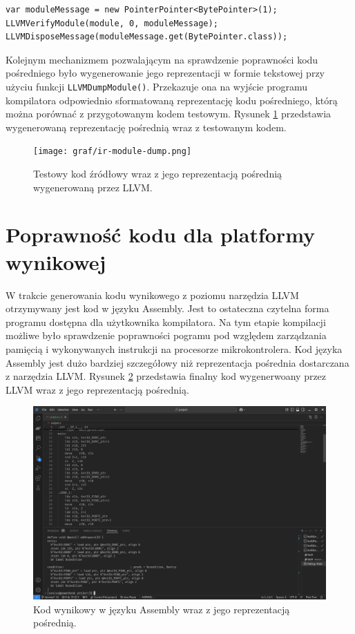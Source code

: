 \begin{lstlisting}[caption={Kod wywołujący kontrolę generowanej reprezentacji pośredniej.}, label={lst:ir-verify}]
var moduleMessage = new PointerPointer<BytePointer>(1);
LLVMVerifyModule(module, 0, moduleMessage);
LLVMDisposeMessage(moduleMessage.get(BytePointer.class)); 
\end{lstlisting}

Kolejnym mechanizmem pozwalającym na sprawdzenie poprawności kodu pośredniego było wygenerowanie jego reprezentacji w formie tekstowej przy użyciu funkcji \mbox{\lstinline|LLVMDumpModule()|.} Przekazuje ona na wyjście programu kompilatora odpowiednio sformatowaną reprezentację kodu pośredniego, którą można porównać z przygotowanym kodem testowym. Rysunek \ref{fig:ir-module-dump} przedstawia wygenerowaną reprezentację pośrednią wraz z testowanym kodem.

\begin{figure}
\centering
	\texttt{[image: graf/ir-module-dump.png]}
	\caption{Testowy kod źródłowy wraz z jego reprezentacją pośrednią wygenerowaną przez LLVM.}
	\label{fig:ir-module-dump}
\end{figure}

\section{Poprawność kodu dla platformy wynikowej}
W trakcie generowania kodu wynikowego z poziomu narzędzia LLVM otrzymywany jest kod w języku Assembly. Jest to ostateczna czytelna forma programu dostępna dla użytkownika kompilatora. Na tym etapie kompilacji możliwe było sprawdzenie poprawności pogramu pod względem zarządzania pamięcią i wykonywanych instrukcji na procesorze mikrokontrolera. Kod języka Assembly jest dużo bardziej szczegółowy niż reprezentacja pośrednia dostarczana z narzędzia LLVM. Rysunek \ref{fig:compiled-asm-vs-ir} przedstawia finalny kod wygenerwoany przez LLVM wraz z jego reprezentacją pośrednią. 

\begin{figure}
	\includegraphics[width=1\textwidth]{graf/compiled-asm-vs-ir.png}
	\caption{Kod wynikowy w języku Assembly wraz z jego reprezentacją pośrednią.}
	\label{fig:compiled-asm-vs-ir}
\end{figure}

